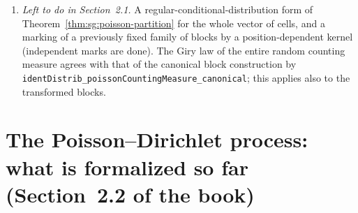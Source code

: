 \begin{remark}
\begin{enumerate}
\emph{Does this limit later sections?} We do not expect so. The book proves the cell statement ``by considering finitely many $m$ at a time'' (proof of Theorem~2.4), so the all-cells equality in law is already stronger than the book's argument. The one later citation we found (the Poisson--Dirichlet setup, Wald's identity $\mathbb E\sum_{x\in\Pi\cap S_m}x=\int_{S_m}x\,\mu(dx)$) uses one cell at a time, with Poisson count, i.i.d.\ points and Wald, and Wald's identity is Lemma~\ref{lem:sg:poisson-campbell}(a). The later ``conditionally on $\mathscr F_{p}$'' arguments of the Ruelle cascade sections appear, from the places we located but did not read in full, to condition on the $\sigma$-algebra of earlier independent levels, which is ordinary independence, not a conditional law over an infinite count vector. The items in Section~2.2 are: (i) Theorem~2.6 marks a \emph{given} process by an independent i.i.d.\ sequence, while our marking theorem is a coupling (item below), which suffices because the conclusion is only equality of mean measures, i.e.\ a statement about laws; (ii) the decreasing enumeration $u_1\ge u_2\ge\dots$ of the points defining $PD(\zeta)$ uses the measurable ``$n$-th largest atom'' map on counting measures (formalized in \texttt{ForMathlib/MeasureTheory/Measure/NthLargestAtom.lean}).
\item \emph{Left to do in Section~2.1.} A regular-conditional-distribution form of Theorem~\ref{thm:sg:poisson-partition} for the whole vector of cells, and a marking of a previously fixed family of blocks by a position-dependent kernel (independent marks are done). The Giry law of the entire random counting measure agrees with that of the canonical block construction by \texttt{identDistrib\_poissonCountingMeasure\_canonical}; this applies also to the transformed blocks.
\end{enumerate}
\end{remark}

\section{The Poisson--Dirichlet process: what is formalized so far (Section~2.2 of the book)}\label{sec:sg:pd}

